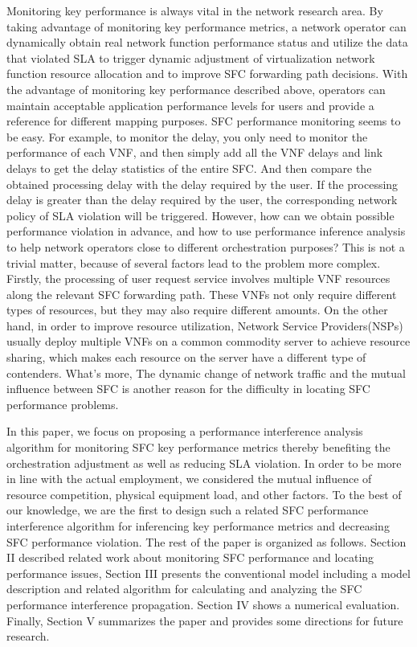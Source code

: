 \documentclass{ieeeaccess}
\begin{document}
Monitoring key performance is always vital in the network research area. By taking advantage of monitoring key performance metrics, a network operator can dynamically obtain real network function performance status and utilize  the data that violated SLA to trigger dynamic adjustment of virtualization network function resource allocation and to improve SFC forwarding path decisions. With the advantage of monitoring key performance described above, operators can maintain acceptable application performance levels for users and provide a reference for different mapping purposes. SFC performance monitoring seems to be easy. For example, to monitor the delay, you only need to monitor the performance of each VNF, and then simply add all the VNF delays and link delays to get the delay statistics of the entire SFC. And then compare the obtained processing delay with the delay required by the user. If the processing delay is greater than the delay required by the user, the corresponding network policy of SLA violation will be triggered. However, how can we obtain possible performance violation in advance, and how to use performance inference analysis to help network operators close to different orchestration purposes? This is not a trivial matter, because of several factors lead to the problem more complex. Firstly, the processing of user request service involves multiple VNF resources along the relevant SFC forwarding path. These VNFs not only require different types of resources, but they may also require different amounts. On the other hand, in order to improve resource utilization, Network Service Providers(NSPs) usually deploy multiple VNFs on a common commodity server to achieve resource sharing, which makes each resource on the server have a different type of contenders. What’s more, The dynamic change of network traffic and the mutual influence between SFC is another reason for the difficulty in locating SFC performance problems.

In this paper, we focus on proposing a performance interference analysis algorithm for monitoring SFC key performance metrics thereby benefiting the orchestration adjustment as well as reducing SLA violation. In order to be more in line with the actual employment, we considered the mutual influence of resource competition, physical equipment load, and other factors. To the best of our knowledge, we are the first to design such a related SFC performance interference algorithm for inferencing key performance metrics and decreasing SFC performance violation.
The rest of the paper is organized as follows. Section II described related work about monitoring SFC performance and locating performance issues, Section III presents the conventional model including a model description and related algorithm for calculating and analyzing the SFC performance interference propagation. Section IV shows a numerical evaluation. Finally, Section V summarizes the paper and provides some directions for future research.
\end{document}
